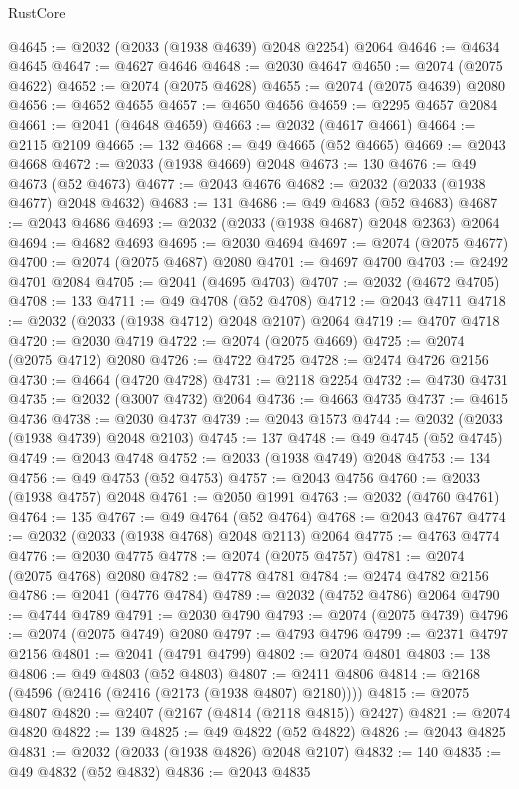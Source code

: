 \begin{lexlean}{RustCore}
\begin{coremodule}
@4645 := @2032 (@2033 (@1938 @4639) @2048 @2254) @2064
@4646 := @4634 @4645
@4647 := @4627 @4646
@4648 := @2030 @4647
@4650 := @2074 (@2075 @4622)
@4652 := @2074 (@2075 @4628)
@4655 := @2074 (@2075 @4639) @2080
@4656 := @4652 @4655
@4657 := @4650 @4656
@4659 := @2295 @4657 @2084
@4661 := @2041 (@4648 @4659)
@4663 := @2032 (@4617 @4661)
@4664 := @2115 @2109
@4665 := 132
@4668 := @49 @4665 (@52 @4665)
@4669 := @2043 @4668
@4672 := @2033 (@1938 @4669) @2048
@4673 := 130
@4676 := @49 @4673 (@52 @4673)
@4677 := @2043 @4676
@4682 := @2032 (@2033 (@1938 @4677) @2048 @4632)
@4683 := 131
@4686 := @49 @4683 (@52 @4683)
@4687 := @2043 @4686
@4693 := @2032 (@2033 (@1938 @4687) @2048 @2363) @2064
@4694 := @4682 @4693
@4695 := @2030 @4694
@4697 := @2074 (@2075 @4677)
@4700 := @2074 (@2075 @4687) @2080
@4701 := @4697 @4700
@4703 := @2492 @4701 @2084
@4705 := @2041 (@4695 @4703)
@4707 := @2032 (@4672 @4705)
@4708 := 133
@4711 := @49 @4708 (@52 @4708)
@4712 := @2043 @4711
@4718 := @2032 (@2033 (@1938 @4712) @2048 @2107) @2064
@4719 := @4707 @4718
@4720 := @2030 @4719
@4722 := @2074 (@2075 @4669)
@4725 := @2074 (@2075 @4712) @2080
@4726 := @4722 @4725
@4728 := @2474 @4726 @2156
@4730 := @4664 (@4720 @4728)
@4731 := @2118 @2254
@4732 := @4730 @4731
@4735 := @2032 (@3007 @4732) @2064
@4736 := @4663 @4735
@4737 := @4615 @4736
@4738 := @2030 @4737
@4739 := @2043 @1573
@4744 := @2032 (@2033 (@1938 @4739) @2048 @2103)
@4745 := 137
@4748 := @49 @4745 (@52 @4745)
@4749 := @2043 @4748
@4752 := @2033 (@1938 @4749) @2048
@4753 := 134
@4756 := @49 @4753 (@52 @4753)
@4757 := @2043 @4756
@4760 := @2033 (@1938 @4757) @2048
@4761 := @2050 @1991
@4763 := @2032 (@4760 @4761)
@4764 := 135
@4767 := @49 @4764 (@52 @4764)
@4768 := @2043 @4767
@4774 := @2032 (@2033 (@1938 @4768) @2048 @2113) @2064
@4775 := @4763 @4774
@4776 := @2030 @4775
@4778 := @2074 (@2075 @4757)
@4781 := @2074 (@2075 @4768) @2080
@4782 := @4778 @4781
@4784 := @2474 @4782 @2156
@4786 := @2041 (@4776 @4784)
@4789 := @2032 (@4752 @4786) @2064
@4790 := @4744 @4789
@4791 := @2030 @4790
@4793 := @2074 (@2075 @4739)
@4796 := @2074 (@2075 @4749) @2080
@4797 := @4793 @4796
@4799 := @2371 @4797 @2156
@4801 := @2041 (@4791 @4799)
@4802 := @2074 @4801
@4803 := 138
@4806 := @49 @4803 (@52 @4803)
@4807 := @2411 @4806
@4814 := @2168 (@4596 (@2416 (@2416 (@2173 (@1938 @4807) @2180))))
@4815 := @2075 @4807
@4820 := @2407 (@2167 (@4814 (@2118 @4815)) @2427)
@4821 := @2074 @4820
@4822 := 139
@4825 := @49 @4822 (@52 @4822)
@4826 := @2043 @4825
@4831 := @2032 (@2033 (@1938 @4826) @2048 @2107)
@4832 := 140
@4835 := @49 @4832 (@52 @4832)
@4836 := @2043 @4835

\end{coremodule}
\end{lexlean}
